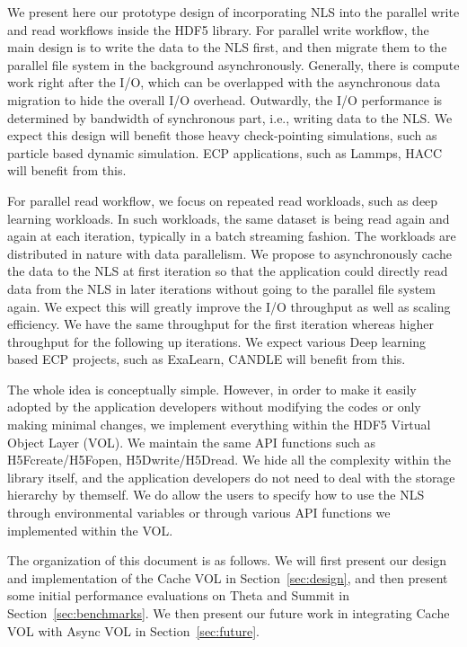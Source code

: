 \documentclass[aps, rmp, 11pt, notitlepage]{revtex4-1}
\begin{document}
We present here our prototype design of incorporating NLS into the parallel write and read workflows inside the HDF5 library. For parallel write workflow, the main design is to write the data to the NLS first, and then migrate them to the parallel file system in the background asynchronously. Generally, there is compute work right after the I/O, which can be overlapped with the asynchronous data migration to hide the overall I/O overhead. Outwardly, the I/O performance is determined by bandwidth of synchronous part, i.e., writing data to the NLS. We expect this design will benefit those heavy check-pointing simulations, such as particle based dynamic simulation. ECP applications, such as Lammps, HACC will benefit from this. 

For parallel read workflow, we focus on repeated read workloads, such as deep learning workloads. In such workloads, the same dataset is being read again and again at each iteration, typically in a batch streaming fashion. The workloads are distributed in nature with data parallelism. We propose to asynchronously cache the data to the NLS at first iteration so that the application could directly read data from the NLS in later iterations without going to the parallel file system again. We expect this will greatly improve the I/O throughput as well as scaling efficiency. We have the same throughput for the first iteration whereas higher throughput for the following up iterations. We expect various Deep learning based ECP projects, such as ExaLearn, CANDLE will benefit from this.

The whole idea is conceptually simple. However, in order to make it easily adopted by the application developers without modifying the codes or only making minimal changes, we implement everything within the HDF5 Virtual Object Layer (VOL). We maintain the same API functions such as H5Fcreate/H5Fopen, H5Dwrite/H5Dread. We hide all the complexity within the library itself, and the application developers do not need to deal with the storage hierarchy by themself. We do allow the users to specify how to use the NLS through environmental variables or through various API functions we implemented within the VOL. 

The organization of this document is as follows. We will first present our design and implementation of the Cache VOL in Section~\ref{sec:design}, and then present some initial performance evaluations on Theta and Summit in Section~\ref{sec:benchmarks}. We then present our future work in integrating Cache VOL with Async VOL in Section~\ref{sec:future}.
\end{document}
